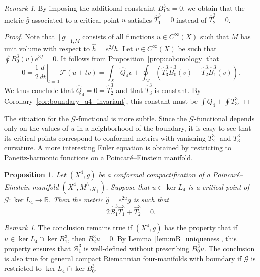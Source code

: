 \documentclass{amsart}
\newtheorem{prop}[thm]{Proposition}
\theoremstyle{definition}
\theoremstyle{remark}
\newtheorem{remark}[thm]{Remark}
\numberwithin{equation}{section}
\begin{document}
\begin{remark}
 By imposing the additional constraint $B_1^3u=0$, we obtain that the metric ${\widehat{g}}$ associated to a critical point $u$ satisfies ${\widehat{T}}_1^3=0$ instead of ${\widehat{T}}_2^3=0$.
\end{remark}

\begin{proof}
 Note that $[g]_{1,M}$ consists of all functions $u\in C^\infty(X)$ such that $M$ has unit volume with respect to ${\widehat{h}}=e^{2f}h$.  Let $v\in C^\infty(X)$ be such that $\oint B_0^3(v)e^{3f}=0$.  It follows from Proposition~\ref{prop:cohomology} that
 \[ 0 = \frac{1}{2}\left.\frac{d}{dt}\right|_{t=0}{\mathcal{F}}(u+tv) = \int_X {\widehat{Q}}_4v + \oint_M \left({\widehat{T}}_3^3{\widehat{B}}_0^3(v) + {\widehat{T}}_2^3{\widehat{B}}_1^3(v)\right) . \]
 We thus conclude that ${\widehat{Q}}_4=0={\widehat{T}}_2^3$ and that ${\widehat{T}}_3^3$ is constant.  By Corollary~\ref{cor:boundary_q4_invariant}, this constant must be $\int Q_4+\oint T_3^3$.
\end{proof}

The situation for the ${\mathcal{G}}$-functional is more subtle.  Since the ${\mathcal{G}}$-functional depends only on the values of $u$ in a neighborhood of the boundary, it is easy to see that its critical points correspond to conformal metrics with vanishing $T_2^3$- and $T_3^3$-curvature.  A more interesting Euler equation is obtained by restricting to Paneitz-harmonic functions on a Poincar\'e--Einstein manifold.

\begin{prop}
 \label{prop:3d_critical_G}
 Let $(X^4,g)$ be a conformal compactification of a Poincar\'e--Einstein manifold $(X^4,M^3,g_+)$.  Suppose that $u\in\ker L_4$ is a critical point of ${\mathcal{G}}\colon\ker L_4\to{\mathbb{R}}$.  Then the metric ${\widehat{g}}=e^{2u}g$ is such that
 \begin{equation}
  \label{eqn:3d_critical_G}
  2{\widehat{\mathcal{B}}}_1^3{\widehat{T}}_1^3 + {\widehat{T}}_2^3 = 0 .
 \end{equation}
\end{prop}

\begin{remark}
 The conclusion remains true if $(X^4,g)$ has the property that if $u\in\ker L_4\cap\ker B_1^3$, then $B_2^3u=0$.  By Lemma~\ref{lem:mB_uniqueness}, this property ensures that ${\mathcal{B}}_1^3$ is well-defined without prescribing $B_0^3u$.  The conclusion is also true for general compact Riemannian four-manifolds with boundary if ${\mathcal{G}}$ is restricted to $\ker L_4\cap\ker B_0^3$.
\end{remark}
\end{document}
